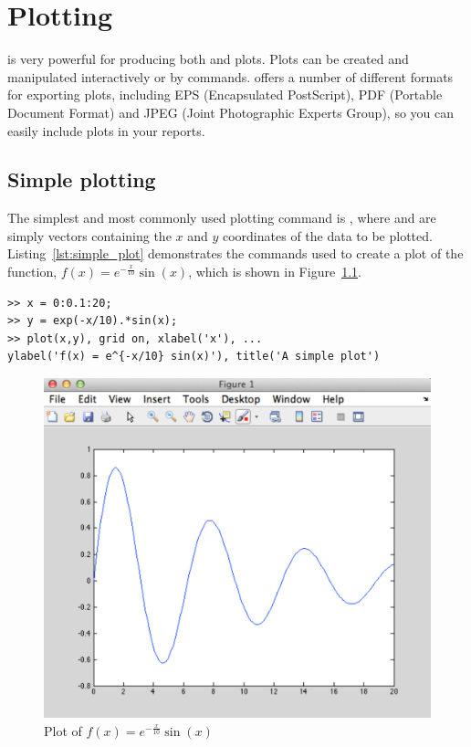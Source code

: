\chapter{Plotting}

\mlab is very powerful for producing both \twod and \threed plots. Plots can be created and manipulated interactively or by commands. \mlab offers a number of different formats for exporting plots, including EPS (Encapsulated PostScript), PDF (Portable Document Format) and JPEG (Joint Photographic Experts Group), so you can easily include \mlab plots in your reports.

\section{Simple \twod plotting}
The simplest and most commonly used plotting command is , where  and  are simply vectors containing the $x$ and $y$ coordinates of the data to be plotted. Listing~\ref{lst:simple_plot} demonstrates the commands used to create a plot of the function, $f(x) = e^{-\frac{x}{10}} \sin(x)$, which is shown in Figure~\ref{fig:simple_plot}.
\begin{lstlisting}[caption={A simple plot},label=lst:simple_plot]
>> x = 0:0.1:20;
>> y = exp(-x/10).*sin(x);
>> plot(x,y), grid on, xlabel('x'), ...
ylabel('f(x) = e^{-x/10} sin(x)'), title('A simple plot')
\end{lstlisting}
\begin{figure}
	\myfloatalign
	\includegraphics[width=0.9\linewidth]{Graphics/Unit02/simple_plot}
	\caption{Plot of $f(x) = e^{-\frac{x}{10}} \sin(x)$}
	\label{fig:simple_plot}
\end{figure}

